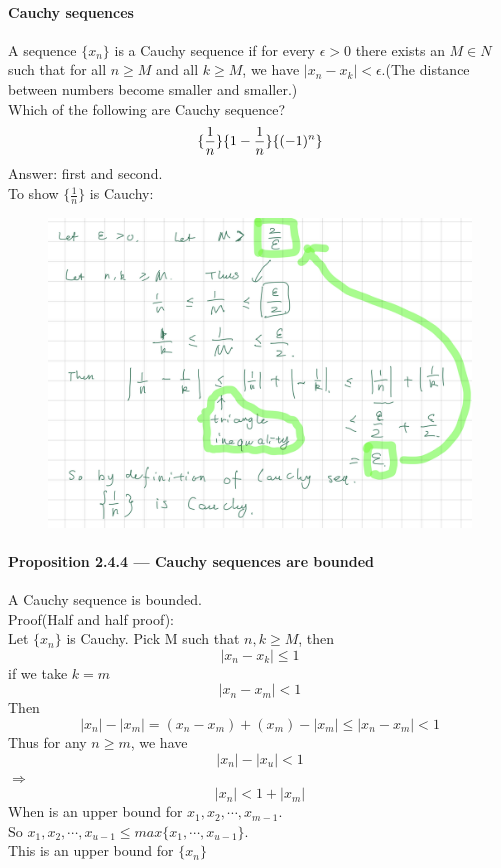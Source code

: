 \documentclass{article}
\begin{document}
\paragraph{Cauchy sequences}
A sequence $\{x_n\}$  is a Cauchy sequence if for every $\epsilon > 0$ there exists an $M\in N$ such that for all $n\ge M$ and all $k\ge M$, we have $|x_n-x_k|<\epsilon$.(The distance between numbers become smaller and smaller.)\\
Which of the following are Cauchy sequence?
$$\{\frac{1}{n}\}\\\{1-\frac{1}{n}\}\\\{(-1)^n\}$$
Answer: first and second.\\
To show $\{\frac{1}{n}\}$ is Cauchy:\\
\begin{figure}[H]
    \centering
    \includegraphics{0133}
\end{figure}
\paragraph{Proposition 2.4.4 — Cauchy sequences are bounded}
A Cauchy sequence is bounded.\\
Proof(Half and half proof):\\
Let $\{x_n\}$ is Cauchy. Pick M such that $n,k\ge M$, then $$|x_n-x_k|\leq 1$$
if we take $k=m$
$$|x_n-x_m|<1$$
Then $$|x_n|-|x_m|=(x_n-x_m)+(x_m)-|x_m|\leq |x_n-x_m|<1$$
Thus for any $n\ge m$, we have $$|x_n|-|x_u|<1$$
$\Longrightarrow$
$$|x_n|<1+|x_m|$$
When is an upper bound  for $x_1,x_2,\cdots,x_{m-1}$.\\
So $x_1,x_2,\cdots, x_{u-1}\leq max\{x_1,\cdots,x_{u-1}\}$.\\
This is an upper bound for $\{x_n\}$
\end{document}
